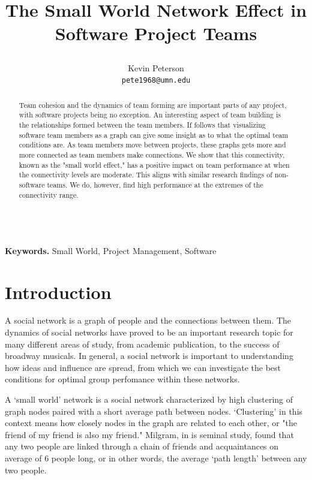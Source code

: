 \documentclass{proc}
\title{
The Small World Network Effect in Software Project Teams
\author{Kevin Peterson\\
\small \texttt{pete1968@umn.edu}
}
}
\begin{document}
\maketitle

\begin{abstract}
Team cohesion and the dynamics of team forming are important parts of any project, with software projects being no exception. An interesting aspect of team building is the relationships formed between the team members. If follows that visualizing software team members as a graph can give some insight as to what the optimal team conditions are. As team members move between projects, these graphs gets more and more connected as team members make connections. We show that this connectivity, known as the "small world effect," has a positive impact on team performance at when the connectivity levels are moderate. This aligns with similar research findings of non-software teams. We do, however, find high performance at the extremes of the connectivity range.
\end{abstract}

\noindent \\\textbf{Keywords.} Small World, Project Management, Software

\section{Introduction}
A social network is a graph of people and the connections between them. The dynamics of social networks have proved to be an important research topic for many different areas of study, from academic publication\cite{barabasi2002evolution}, to the success of broadway musicals\cite{uzzi2005collaboration}. In general, a social network is important to understanding how ideas and influence are spread\cite{kempe2003maximizing}, from which we can investigate the best conditions for optimal group perfomance within these networks.

A `small world' network is a social network characterized by high clustering of graph nodes paired with a short average path between nodes\cite{watts1998collective}. `Clustering' in this context means how closely nodes in the graph are related to each other, or "the friend of my friend is also my friend." Milgram, in is seminal study, found that any two people are linked through a chain of friends and acquaintances on average of 6 people long\cite{milgram1967small}, or in other words, the average `path length' between any two people.
\end{document}
